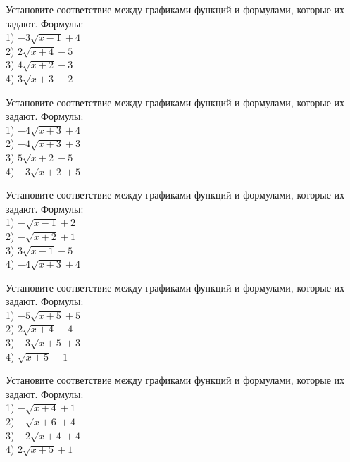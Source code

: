 \documentclass[4apaper]{article}
\begin{document}
\begin{taskBN}{51}
Установите соответствие между графиками функций и формулами, которые их задают. Формулы: \\1) $-3\sqrt{x-1}+4$\\2) $2\sqrt{x+4}-5$\\3) $4\sqrt{x+2}-3$\\4) $3\sqrt{x+3}-2$
\end{taskBN}

\begin{taskBN}{52}
Установите соответствие между графиками функций и формулами, которые их задают. Формулы: \\1) $-4\sqrt{x+3}+4$\\2) $-4\sqrt{x+3}+3$\\3) $5\sqrt{x+2}-5$\\4) $-3\sqrt{x+2}+5$
\end{taskBN}

\begin{taskBN}{53}
Установите соответствие между графиками функций и формулами, которые их задают. Формулы: \\1) $-\sqrt{x-1}+2$\\2) $-\sqrt{x+2}+1$\\3) $3\sqrt{x-1}-5$\\4) $-4\sqrt{x+3}+4$
\end{taskBN}

\begin{taskBN}{54}
Установите соответствие между графиками функций и формулами, которые их задают. Формулы: \\1) $-5\sqrt{x+5}+5$\\2) $2\sqrt{x+4}-4$\\3) $-3\sqrt{x+5}+3$\\4) $\sqrt{x+5}-1$
\end{taskBN}

\begin{taskBN}{55}
Установите соответствие между графиками функций и формулами, которые их задают. Формулы: \\1) $-\sqrt{x+4}+1$\\2) $-\sqrt{x+6}+4$\\3) $-2\sqrt{x+4}+4$\\4) $2\sqrt{x+5}+1$
\end{taskBN}
\end{document}
